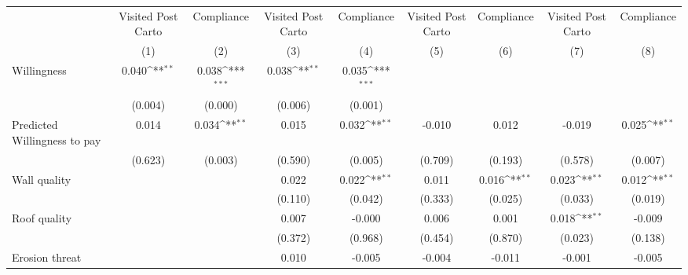 {
\def\sym#1{\ifmmode^{#1}\else\(^{#1}\)\fi}
\begin{tabular}{l*{8}{c}}
\toprule
                &\multicolumn{1}{c}{Visited Post Carto}&\multicolumn{1}{c}{Compliance}&\multicolumn{1}{c}{Visited Post Carto}&\multicolumn{1}{c}{Compliance}&\multicolumn{1}{c}{Visited Post Carto}&\multicolumn{1}{c}{Compliance}&\multicolumn{1}{c}{Visited Post Carto}&\multicolumn{1}{c}{Compliance}\\
                &\multicolumn{1}{c}{(1)}         &\multicolumn{1}{c}{(2)}         &\multicolumn{1}{c}{(3)}         &\multicolumn{1}{c}{(4)}         &\multicolumn{1}{c}{(5)}         &\multicolumn{1}{c}{(6)}         &\multicolumn{1}{c}{(7)}         &\multicolumn{1}{c}{(8)}         \\
\midrule
Willingness     &    0.040\sym{**} &    0.038\sym{***}&    0.038\sym{**} &    0.035\sym{***}&                  &                  &                  &                  \\
                &  (0.004)         &  (0.000)         &  (0.006)         &  (0.001)         &                  &                  &                  &                  \\
Predicted Willingness to pay&    0.014         &    0.034\sym{**} &    0.015         &    0.032\sym{**} &   -0.010         &    0.012         &   -0.019         &    0.025\sym{**} \\
                &  (0.623)         &  (0.003)         &  (0.590)         &  (0.005)         &  (0.709)         &  (0.193)         &  (0.578)         &  (0.007)         \\
Wall quality    &                  &                  &    0.022         &    0.022\sym{**} &    0.011         &    0.016\sym{**} &    0.023\sym{**} &    0.012\sym{**} \\
                &                  &                  &  (0.110)         &  (0.042)         &  (0.333)         &  (0.025)         &  (0.033)         &  (0.019)         \\
Roof quality    &                  &                  &    0.007         &   -0.000         &    0.006         &    0.001         &    0.018\sym{**} &   -0.009         \\
                &                  &                  &  (0.372)         &  (0.968)         &  (0.454)         &  (0.870)         &  (0.023)         &  (0.138)         \\
Erosion threat  &                  &                  &    0.010         &   -0.005         &   -0.004         &   -0.011         &   -0.001         &   -0.005         \\

\end{tabular}}
